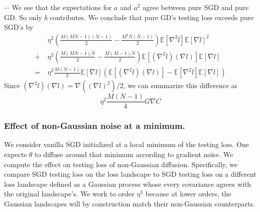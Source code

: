 \documentclass[final,12pt]{colt2021} %
\newcommand{\wrap}[1]{\left(#1\right)}
\newcommand{\expct}[1]{\mathbb{E}\left[#1\right]}
\begin{document}
            \newpage
            \begin{shaded}
                $\cdots$ We see that the expectations for $a$ and $a^2$ agree
                between pure SGD and pure GD.  So only $b$ contributes.  We
                conclude that pure GD's testing loss exceeds pure SGD's by
                \begin{align*}
                       ~&\eta^2
                        \wrap{\frac{M(MN-1)(N-1)}{2}  - \frac{M^2N(N-1)}{2}}
                        \expct{\nabla^2 l} \expct{\nabla l}^2 \\
                    +   ~&\eta^2 
                        \wrap{\frac{M(MN-1)N}{2} - \frac{M(M-1)N}{2}}
                        \expct{(\nabla^2 l) (\nabla l)} \expct{\nabla l} \\
                    = 
                        ~&\eta^2     \frac{M(N-1)}{2}
                    \expct{\nabla l} \wrap{
                          \expct{(\nabla^2 l) (\nabla l)}
                        - \expct{\nabla^2 l} \expct{\nabla l}
                    }
                \end{align*}
                Since $(\nabla^2 l) (\nabla l) = \nabla((\nabla l)^2)/2$, we can 
                summarize this difference as
                $$
                    \eta^2 \frac{M(N-1)}{4}
                    G \nabla C 
                $$
            \end{shaded}

        \subsubsection{Effect of non-Gaussian noise at a minimum.}
            We consider vanilla SGD initialized at a local minimum of the testing loss.
            One expects $\theta$ to diffuse around that minimum according to
            gradient noise.  We compute the effect on testing loss of non-Gaussian
            diffusion.  Specifically, we compare SGD testing loss on the loss
            landscape to SGD testing loss on a different loss landscape defined as a
            Gaussian process whose every covariance agrees with the original
            landscape's.  We work to order $\eta^3$ because at lower orders,
            the Gaussian landscapes will by construction match their non-Gaussian
            counterparts.
\end{document}
